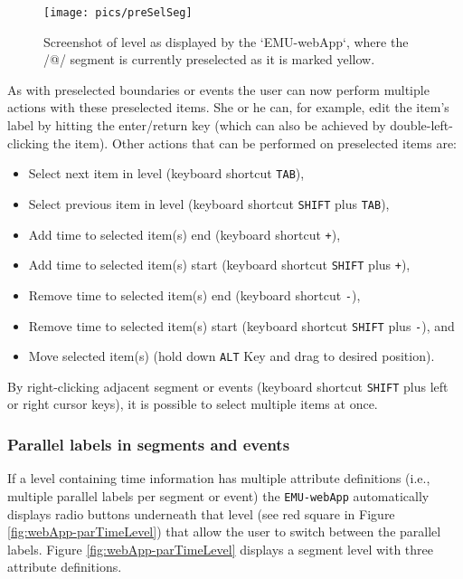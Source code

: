 \documentclass[
]{book}
\providecommand{\tightlist}{%
  \setlength{\itemsep}{0pt}\setlength{\parskip}{0pt}}
\begin{document}
\begin{figure}

{\centering \texttt{[image: pics/preSelSeg]} 

}

\caption{Screenshot of level as displayed by the `EMU-webApp`, where the /@/ segment is currently preselected as it is marked yellow.}\label{fig:webApp-preSelSeg}
\end{figure}

As with preselected boundaries or events the user can now perform multiple actions with these preselected items. She or he can, for example, edit the item's label by hitting the enter/return key (which can also be achieved by double-left-clicking the item). Other actions that can be performed on preselected items are:

\begin{itemize}
\tightlist
\item
  Select next item in level (keyboard shortcut \texttt{TAB}),
\item
  Select previous item in level (keyboard shortcut \texttt{SHIFT} plus \texttt{TAB}),
\item
  Add time to selected item(s) end (keyboard shortcut \texttt{+}),
\item
  Add time to selected item(s) start (keyboard shortcut \texttt{SHIFT} plus \texttt{+}),
\item
  Remove time to selected item(s) end (keyboard shortcut \texttt{-}),
\item
  Remove time to selected item(s) start (keyboard shortcut \texttt{SHIFT} plus \texttt{-}), and
\item
  Move selected item(s) (hold down \texttt{ALT} Key and drag to desired position).
\end{itemize}

By right-clicking adjacent segment or events (keyboard shortcut \texttt{SHIFT} plus left or right cursor keys), it is possible to select multiple items at once.

\hypertarget{parallel-labels-in-segments-and-events}{%
\subsubsection*{Parallel labels in segments and events}\label{parallel-labels-in-segments-and-events}}

If a level containing time information has multiple attribute definitions (i.e., multiple parallel labels per segment or event) the \texttt{EMU-webApp} automatically displays radio buttons underneath that level (see red square in Figure \ref{fig:webApp-parTimeLevel}) that allow the user to switch between the parallel labels. Figure \ref{fig:webApp-parTimeLevel} displays a segment level with three attribute definitions.
\end{document}
